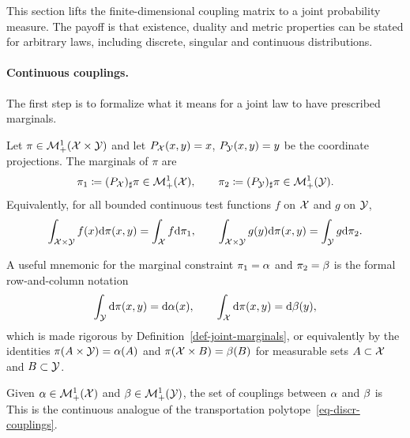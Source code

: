 This section lifts the finite-dimensional coupling matrix to a joint probability measure. The payoff is that existence, duality and metric properties can be stated for arbitrary laws, including discrete, singular and continuous distributions.

\paragraph{Continuous couplings.}

The first step is to formalize what it means for a joint law to have prescribed marginals.

\begin{defn}\label{def-joint-marginals}
	Let $\pi\in\mathcal{M}_+^1(\mathcal{X}\times\mathcal{Y})$ and let $P_{\mathcal{X}}(x,y)=x$, $P_{\mathcal{Y}}(x,y)=y$ be the coordinate projections. The marginals of $\pi$ are
	\[
		\pi_1\coloneqq(P_{\mathcal{X}})_\sharp\pi\in\mathcal{M}_+^1(\mathcal{X}),
		\qquad
		\pi_2\coloneqq(P_{\mathcal{Y}})_\sharp\pi\in\mathcal{M}_+^1(\mathcal{Y}).
	\]
	Equivalently, for all bounded continuous test functions $f$ on $\mathcal{X}$ and $g$ on $\mathcal{Y}$,
	\[
		\int_{\mathcal{X}\times\mathcal{Y}} f(x)\mathrm{d}\pi(x,y)=\int_{\mathcal{X}} f\mathrm{d}\pi_1,
		\qquad
		\int_{\mathcal{X}\times\mathcal{Y}} g(y)\mathrm{d}\pi(x,y)=\int_{\mathcal{Y}} g\mathrm{d}\pi_2.
	\]
\end{defn}

A useful mnemonic for the marginal constraint $\pi_1=\alpha$ and $\pi_2=\beta$ is the formal row-and-column notation
\[
	\int_{\mathcal{Y}} \mathrm{d}\pi(x,y)=\mathrm{d}\alpha(x),
	\qquad
	\int_{\mathcal{X}} \mathrm{d}\pi(x,y)=\mathrm{d}\beta(y),
\]
which is made rigorous by Definition~\ref{def-joint-marginals}, or equivalently by the identities $\pi(A\times\mathcal{Y})=\alpha(A)$ and $\pi(\mathcal{X}\times B)=\beta(B)$ for measurable sets $A\subset\mathcal{X}$ and $B\subset\mathcal{Y}$.

\begin{defn}[Couplings]\label{def-continuous-couplings}
	Given $\alpha\in\mathcal{M}_+^1(\mathcal{X})$ and $\beta\in\mathcal{M}_+^1(\mathcal{Y})$, the set of couplings between $\alpha$ and $\beta$ is
	This is the continuous analogue of the transportation polytope~\eqref{eq-discr-couplings}.
\end{defn}

